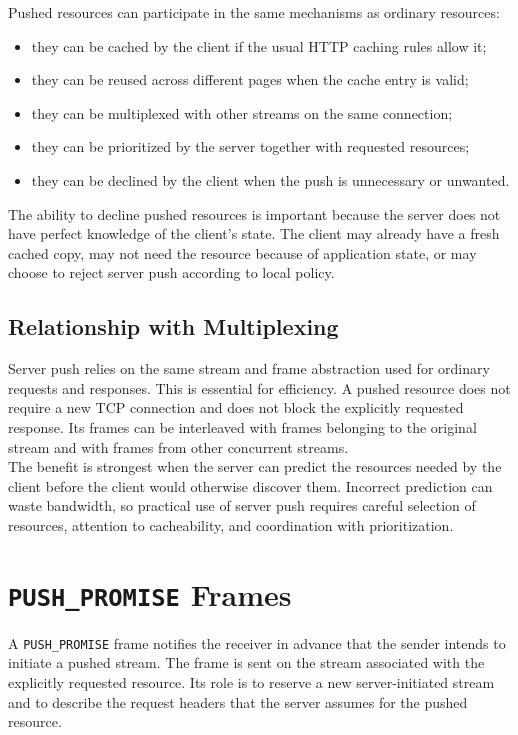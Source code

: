 \documentclass{scrbook}
\begin{document}
Pushed resources can participate in the same mechanisms as ordinary resources:

\begin{itemize}
    \item they can be cached by the client if the usual HTTP caching rules allow it;
    \item they can be reused across different pages when the cache entry is valid;
    \item they can be multiplexed with other streams on the same connection;
    \item they can be prioritized by the server together with requested resources;
    \item they can be declined by the client when the push is unnecessary or unwanted.
\end{itemize}

The ability to decline pushed resources is important because the server does not have perfect knowledge of the client's state. The client may already have a fresh cached copy, may not need the resource because of application state, or may choose to reject server push according to local policy.

\subsection{Relationship with Multiplexing}

Server push relies on the same stream and frame abstraction used for ordinary requests and responses. This is essential for efficiency. A pushed resource does not require a new TCP connection and does not block the explicitly requested response. Its frames can be interleaved with frames belonging to the original stream and with frames from other concurrent streams.\\

The benefit is strongest when the server can predict the resources needed by the client before the client would otherwise discover them. Incorrect prediction can waste bandwidth, so practical use of server push requires careful selection of resources, attention to cacheability, and coordination with prioritization.

\section{\texttt{PUSH\_PROMISE} Frames}

A \texttt{PUSH\_PROMISE} frame notifies the receiver in advance that the sender intends to initiate a pushed stream. The frame is sent on the stream associated with the explicitly requested resource. Its role is to reserve a new server-initiated stream and to describe the request headers that the server assumes for the pushed resource.\\
\end{document}
